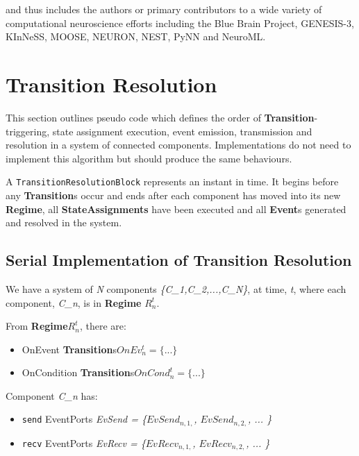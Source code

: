 \documentclass{article}
\newcommand{\Events}{{\bf{Event}}s\xspace}
\newcommand{\Regime}{{\bf{Regime}}\xspace}
\newcommand{\Transition}{{\bf{Transition}}\xspace}
\newcommand{\Transitions}{{\bf{Transition}}s\xspace}
\begin{document}
and thus includes the authors or primary contributors to a wide
variety of computational neuroscience efforts including the Blue Brain
Project, GENESIS-3, KInNeSS, MOOSE, NEURON, NEST, PyNN and NeuroML.



\section{Transition Resolution}
\label{resolution}

This section outlines pseudo code which defines the order of
\Transition-triggering, state assignment execution, event emission,
transmission and resolution in a system of connected components.
Implementations do not need to implement this algorithm but should produce
the same behaviours.

A {\tt TransitionResolutionBlock} represents an instant in time. It begins
before any \Transitions occur and ends after each component has moved
into its new \Regime, all \textbf{StateAssignments} have been executed
and all \Events generated and resolved in the system.

\subsection{Serial Implementation of Transition Resolution}

\newcommand{\CN}[0]{\textsl{C\_n}}

We have a system of \textsl{N} components \textsl{\{C\_1,C\_2,...,C\_N\}},
at time, \textsl{t}, where each component, \CN, is in \Regime
$R^{t}_{n}$.

\noindent From \Regime $R^{t}_{n}$, there are:
\begin{itemize}
\item OnEvent \Transitions $OnEv^{t}_{n} = \{ ... \}$
\item OnCondition \Transitions $OnCond^{t}_{n} = \{ ... \}$
\end{itemize}

\newcommand{\send}[0]{\texttt{send} }
\newcommand{\recv}[0]{\texttt{recv} }

\noindent Component \CN
has:
\begin{itemize}
\item \send EventPorts \textsl{EvSend = \{$EvSend_{n,1,}$, $EvSend_{n,2,}$, ...  \}}
\item \recv EventPorts \textsl{EvRecv = \{$EvRecv_{n,1,}$, $EvRecv_{n,2,}$, ...  \}}
\end{itemize}
\end{document}
